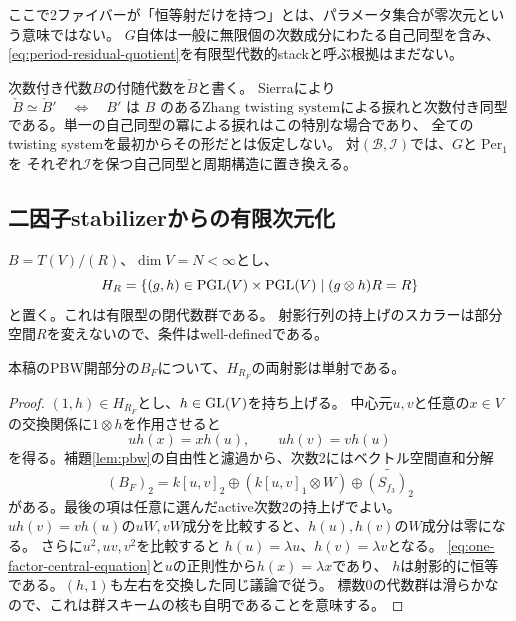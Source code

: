 ここで2ファイバーが「恒等射だけを持つ」とは、パラメータ集合が零次元という意味ではない。
$G$自体は一般に無限個の次数成分にわたる自己同型を含み、
\eqref{eq:period-residual-quotient}を有限型代数的stackと呼ぶ根拠はまだない。

次数付き代数$B$の付随代数を$\check B$と書く。
Sierra\cite[Theorem~1.2, Corollary~4.4]{SierraGAlgebras}により
\begin{equation}\label{eq:sierra-zhang-comparison}
 \check B\simeq\check B'
 \quad\Longleftrightarrow\quad
 B'\text{ は }B\text{ のあるZhang twisting systemによる捩れと次数付き同型}
\end{equation}
である。単一の自己同型の冪による捩れはこの特別な場合であり、
全てのtwisting systemを最初からその形だとは仮定しない。
対$(\mathcal B,\mathcal I)$では、$G$と$\operatorname{Per}_1$を
それぞれ$\mathcal I$を保つ自己同型と周期構造に置き換える。

\subsection{二因子stabilizerからの有限次元化}
$B=T(V)/(R)$、$\dim V=N<\infty$とし、
\begin{equation}\label{eq:two-factor-stabilizer}
 H_R=\{(g,h)\in\mathrm{PGL}(V)\times\mathrm{PGL}(V)
       \mid(g\otimes h)R=R\}
\end{equation}
と置く。これは有限型の閉代数群である。
射影行列の持上げのスカラーは部分空間$R$を変えないので、条件はwell-definedである。

\begin{lemma}[中心二変数による一意延長]\label{lem:two-factor-injective}
本稿のPBW開部分の$B_F$について、$H_{R_F}$の両射影は単射である。
\end{lemma}
\begin{proof}
$(1,h)\in H_{R_F}$とし、$h\in\mathrm{GL}(V)$を持ち上げる。
中心元$u,v$と任意の$x\in V$の交換関係に$1\otimes h$を作用させると
\begin{equation}\label{eq:one-factor-central-equation}
 u h(x)=x h(u),\qquad u h(v)=v h(u)
\end{equation}
を得る。補題\ref{lem:pbw}の自由性と濾過から、次数2にはベクトル空間直和分解
\[
 (B_F)_2=k[u,v]_2\oplus(k[u,v]_1\otimes W)\oplus\widetilde{(S_{f_3})_2}
\]
がある。最後の項は任意に選んだactive次数2の持上げでよい。
$u h(v)=v h(u)$の$uW,vW$成分を比較すると、$h(u),h(v)$の$W$成分は零になる。
さらに$u^2,uv,v^2$を比較すると
$h(u)=\lambda u$、$h(v)=\lambda v$となる。
\eqref{eq:one-factor-central-equation}と$u$の正則性から$h(x)=\lambda x$であり、
$h$は射影的に恒等である。$(h,1)$も左右を交換した同じ議論で従う。
標数0の代数群は滑らかなので、これは群スキームの核も自明であることを意味する。
\end{proof}

